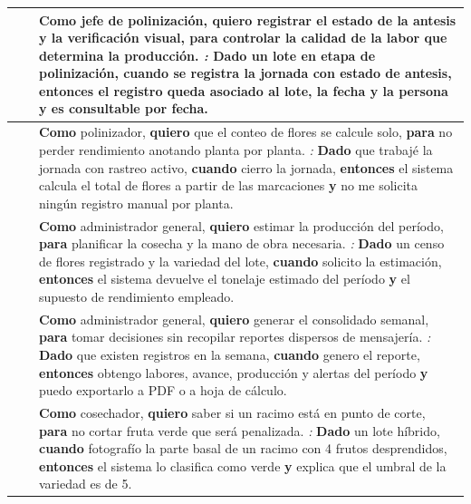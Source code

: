 \begin{longtable}{|C{1.3cm}|C{1.3cm}|L{12.4cm}|}
 &  & \textbf{Como} jefe de polinización, \textbf{quiero} registrar el estado de la antesis y la verificación visual, \textbf{para} controlar la calidad de la labor que determina la producción. \newline \emph{:} \textbf{Dado} un lote en etapa de polinización, \textbf{cuando} se registra la jornada con estado de antesis, \textbf{entonces} el registro queda asociado al lote, la fecha y la persona \textbf{y} es consultable por fecha. \\ \hline

 &  & \textbf{Como} polinizador, \textbf{quiero} que el conteo de flores se calcule solo, \textbf{para} no perder rendimiento anotando planta por planta. \newline \emph{:} \textbf{Dado} que trabajé la jornada con rastreo activo, \textbf{cuando} cierro la jornada, \textbf{entonces} el sistema calcula el total de flores a partir de las marcaciones \textbf{y} no me solicita ningún registro manual por planta. \\ \hline

 &  & \textbf{Como} administrador general, \textbf{quiero} estimar la producción del período, \textbf{para} planificar la cosecha y la mano de obra necesaria. \newline \emph{:} \textbf{Dado} un censo de flores registrado y la variedad del lote, \textbf{cuando} solicito la estimación, \textbf{entonces} el sistema devuelve el tonelaje estimado del período \textbf{y} el supuesto de rendimiento empleado. \\ \hline

 &  & \textbf{Como} administrador general, \textbf{quiero} generar el consolidado semanal, \textbf{para} tomar decisiones sin recopilar reportes dispersos de mensajería. \newline \emph{:} \textbf{Dado} que existen registros en la semana, \textbf{cuando} genero el reporte, \textbf{entonces} obtengo labores, avance, producción y alertas del período \textbf{y} puedo exportarlo a PDF o a hoja de cálculo. \\ \hline

 &  & \textbf{Como} cosechador, \textbf{quiero} saber si un racimo está en punto de corte, \textbf{para} no cortar fruta verde que será penalizada. \newline \emph{:} \textbf{Dado} un lote híbrido, \textbf{cuando} fotografío la parte basal de un racimo con 4 frutos desprendidos, \textbf{entonces} el sistema lo clasifica como verde \textbf{y} explica que el umbral de la variedad es de 5. \\ \hline


\end{longtable}
